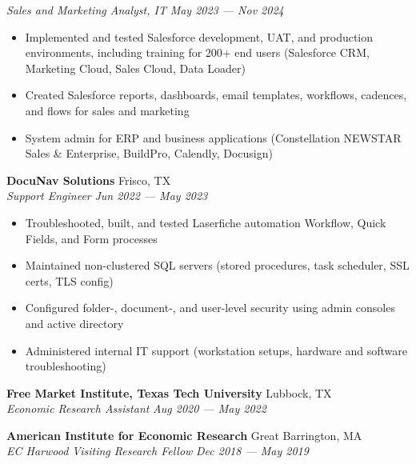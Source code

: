 \documentclass[a4paper,11pt]{article}
\begin{document}
\textit{Sales and Marketing Analyst, IT} \hfill  \textit{May 2023 --- Nov 2024} \\
\begin{itemize}
    \item Implemented and tested Salesforce development, UAT, and production environments, including training for 200+ end users (Salesforce CRM, Marketing Cloud, Sales Cloud, Data Loader) 
    \item Created Salesforce reports, dashboards, email templates, workflows, cadences, and flows for sales and marketing
    \item System admin for ERP and business applications (Constellation NEWSTAR Sales \& Enterprise, BuildPro, Calendly, Docusign)
\end{itemize}
\vspace{0.5mm}

\textbf{DocuNav Solutions} \hfill Frisco, TX \\
\textit{Support Engineer} \hfill  \textit{Jun 2022 --- May 2023} \\
\begin{itemize}
    \item Troubleshooted, built, and tested Laserfiche automation Workflow, Quick Fields, and Form processes
    \item Maintained non-clustered SQL servers (stored procedures, task scheduler, SSL certs, TLS config)
    \item Configured folder-, document-, and user-level security using admin consoles and active directory
    \item Administered internal IT support (workstation setups, hardware and software troubleshooting)
\end{itemize}    
\vspace{0.5mm}

\textbf{Free Market Institute, Texas Tech University} \hfill Lubbock, TX\\
\textit{Economic Research Assistant} \hfill  \textit{Aug 2020 --- May 2022} \\
\vspace{0.5mm}

\textbf{American Institute for Economic Research} \hfill Great Barrington, MA\\
\textit{EC Harwood Visiting Research Fellow} \hfill  \textit{Dec 2018 --- May 2019}\\
\vspace{0.5mm}
\end{document}
